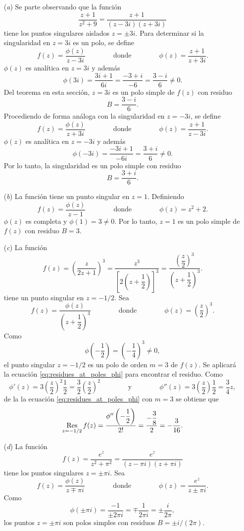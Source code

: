 \documentclass[a4paper]{report}
\def\Res{\qopname\relax m{Res}}
\begin{document}
\begin{enumerate}
 \item[(\textit{a})] Se parte observando que la función
 \[
  \frac{z+1}{z^2+9}=\frac{z+1}{(z-3i)(z+3i)}
 \]
 tiene los puntos singulares aislados \(z=\pm3i\). Para determinar si la singularidad en \(z=3i\) es un polo, se define
 \[
  f(z)=\frac{\phi(z)}{z-3i}
  \qquad\qquad\textrm{donde}\qquad\qquad
  \phi(z)=\frac{z+1}{z+3i}.
 \]
 \(\phi(z)\) es analítica en \(z=3i\) y además
 \[
  \phi(3i)=\frac{3i+1}{6i}=\frac{-3+i}{-6}=\frac{3-i}{6}\neq0.
 \]
 Del teorema en esta sección, \(z=3i\) es un polo simple de \(f(z)\) con residuo
 \[
  B=\frac{3-i}{6}.
 \]
 Procediendo de forma análoga con la singularidad en \(z=-3i\), se define 
 \[
  f(z)=\frac{\phi(z)}{z+3i}
  \qquad\qquad\textrm{donde}\qquad\qquad
  \phi(z)=\frac{z+1}{z-3i}.
 \]
 \(\phi(z)\) es analítica en \(z=-3i\) y además
 \[
  \phi(-3i)=\frac{-3i+1}{-6i}=\frac{3+i}{6}\neq0.
 \]
 Por lo tanto, la singularidad es un polo simple con residuo
 \[
  B=\frac{3+i}{6}.
 \]
 \item[(\textit{b})] La función tiene un punto singular en \(z=1\). Definiendo
 \[
  f(z)=\frac{\phi(z)}{z-1}
  \qquad\qquad\textrm{donde}\qquad\qquad
  \phi(z)=z^2+2.
 \]
 \(\phi(z)\) es completa y \(\phi(1)=3\neq0\). Por lo tanto, \(z=1\) es un polo simple de \(f(z)\) con residuo \(B=3\).
 \item[(\textit{c})] La función
 \[
  f(z)=\left(\frac{z}{2z+1}\right)^3=\frac{z^3}{\left[2\left(z+\dfrac{1}{2}\right)\right]^3}
    =\frac{\left(\dfrac{z}{2}\right)^3}{\left(z+\dfrac{1}{2}\right)^3}.
 \]
 tiene un punto singular en \(z=-1/2\). Sea 
 \[
  f(z)=\frac{\phi(z)}{\left(z+\dfrac{1}{2}\right)^3}
  \qquad\qquad\textrm{donde}\qquad\qquad
  \phi(z)=\left(\dfrac{z}{2}\right)^3.
 \]
 Como
 \[
  \phi\left(-\frac{1}{2}\right)=\left(-\dfrac{1}{4}\right)^3\neq0,
 \]
 el punto singular \(z=-1/2\) es un polo de orden \(m=3\) de \(f(z)\). Se aplicará la ecuación \ref{eq:residues_at_poles_phi} para encontrar el residuo. Como
 \[
  \phi'(z)=3\left(\dfrac{z}{2}\right)^2\frac{1}{2}=\frac{3}{2}\left(\dfrac{z}{2}\right)^2
  \qquad\qquad\textrm{y}\qquad\qquad
  \phi''(z)=3\left(\dfrac{z}{2}\right)\frac{1}{2}=\frac{3}{4}z,
 \]
 de la la ecuación \ref{eq:residues_at_poles_phi} con \(m=3\) se obtiene que 
 \[
  \Res_{z=-1/2}f(z)=\frac{\phi''\left(-\dfrac{1}{2}\right)}{2!}=\frac{-\dfrac{3}{8}}{2}=-\frac{3}{16}.
 \]
 \item[(\textit{d})] La función
 \[
  f(z)=\frac{e^z}{z^2+\pi^2}=\frac{e^z}{(z-\pi i)(z+\pi i)}
 \]
 tiene los puntos singulares \(z=\pm\pi i\). Sea 
 \[
  f(z)=\frac{\phi(z)}{z\mp\pi i}
  \qquad\qquad\textrm{donde}\qquad\qquad
  \phi(z)=\frac{e^z}{z\pm\pi i}.
 \]
 Como
 \[
  \phi(\pm\pi i)=\frac{-1}{\pm2\pi i}=\mp\frac{1}{2\pi i}=\pm\frac{i}{2\pi},
 \]
 los puntos \(z=\pm\pi i\) son polos simples con residuos \(B=\pm i/(2\pi)\).
\end{enumerate} 
\end{document}

